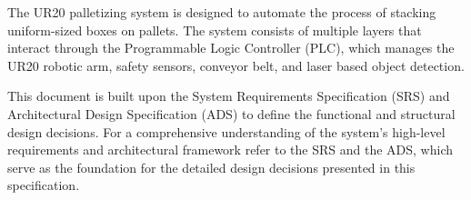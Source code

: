 

The UR20 palletizing system is designed to automate the process of stacking uniform-sized boxes on pallets. The system consists of multiple layers that interact through the Programmable Logic Controller (PLC), which manages the UR20 robotic arm, safety sensors, conveyor belt, and laser based object detection. 

This document is built upon the System Requirements Specification (SRS) and Architectural Design Specification (ADS) to define the functional and structural design decisions. For a comprehensive understanding of the system's high-level requirements and architectural framework refer to the SRS and the ADS, which serve as the foundation for the detailed design decisions presented in this specification.
